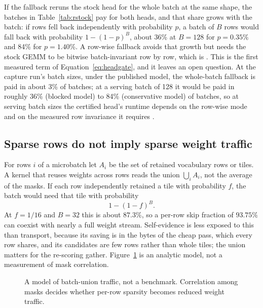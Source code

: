 If the fallback reruns the stock head for the whole batch at the same shape, the batches in Table~\ref{tab:rstock} pay for both heads, and that share grows with the batch: if rows fell back independently with probability $p$, a batch of $B$ rows would fall back with probability $1-(1-p)^B$, about 36\% at $B=128$ for $p=0.35\%$ and 84\% for $p=1.40\%$. A row-wise fallback avoids that growth but needs the stock GEMM to be bitwise batch-invariant row by row, which is . This is the first measured term of Equation~\eqref{eq:headgate}, and it leaves an open question. At the capture run's batch sizes, under the published model, the whole-batch fallback is paid in about 3\% of batches; at a serving batch of 128 it would be paid in roughly 36\% (blocked model) to 84\% (conservative model) of batches, so at serving batch sizes the certified head's runtime depends on the row-wise mode and on the measured row invariance it requires .

\subsection{Sparse rows do not imply sparse weight traffic}\label{sec:union}
For rows $i$ of a microbatch let $A_i$ be the set of retained vocabulary rows or tiles. A kernel that reuses weights across rows reads the union $\bigcup_iA_i$, not the average of the masks. If each row independently retained a tile with probability $f$, the batch would need that tile with probability
\begin{equation}1-(1-f)^B.\label{eq:union}\end{equation}
At $f=1/16$ and $B=32$ this is about $87.3\%$, so a per-row skip fraction of $93.75\%$ can coexist with nearly a full weight stream. Self-evidence is less exposed to this than transport, because its saving is in the bytes of the cheap pass, which every row shares, and its candidates are few rows rather than whole tiles; the union matters for the re-scoring gather. Figure~\ref{fig:union} is an analytic model, not a measurement of mask correlation.

\begin{figure}[tbp]
\centering
{}
\caption{A model of batch-union traffic, not a benchmark. Correlation among masks decides whether per-row sparsity becomes reduced weight traffic.}
\label{fig:union}
\end{figure}

